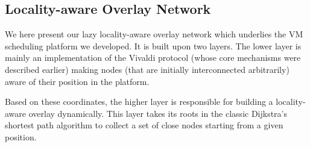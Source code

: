 
\subsection{Locality-aware Overlay Network \label{ssec:lao}}

We here present our lazy locality-aware overlay network which underlies the VM scheduling
platform we developed. It is built upon two layers. The lower layer is mainly an
implementation of the Vivaldi protocol (whose core mechanisms were described earlier)
making nodes (that are initially interconnected arbitrarily) aware of their position in
the platform.

Based on these coordinates, the higher layer is responsible for building a locality-aware
overlay dynamically. This layer takes its roots in the classic Dijkstra's shortest path
algorithm to collect a set of close nodes starting from a given position.







